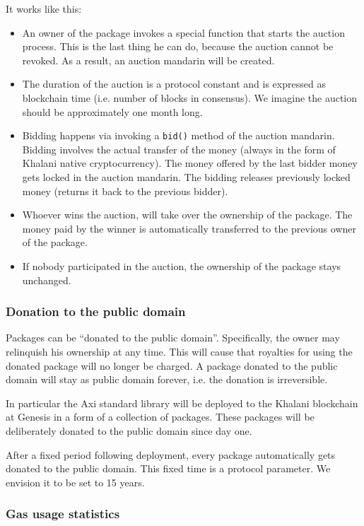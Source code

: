 \documentclass[a4paper]{article}
\newcommand{\code}[1]{{\small \texttt{#1}}}
\begin{document}
It works like this:

\begin{itemize}
  \item An owner of the package invokes a special function that starts the auction process. This is the last thing he can do, because the auction cannot be revoked. As a result, an auction mandarin will be created.
  \item The duration of the auction is a protocol constant and is expressed as blockchain time (i.e. number of blocks in consensus). We imagine the auction should be approximately one month long.
  \item Bidding happens via invoking a \code{bid()} method of the auction mandarin. Bidding involves the actual transfer of the money (always in the form of Khalani native cryptocurrency). The money offered by the last bidder money gets locked in the auction mandarin. The bidding releases previously locked money (returns it back to the previous bidder).
  \item Whoever wins the auction, will take over the ownership of the package. The money paid by the winner is automatically transferred to the previous owner of the package.
  \item If nobody participated in the auction, the ownership of the package stays unchanged.
\end{itemize}

\subsubsection{Donation to the public domain}

Packages can be ``donated to the public domain''. Specifically, the owner may relinquish his ownership at any time. This will cause that royalties for using the donated package will no longer be charged. A package donated to the public domain will stay as public domain forever, i.e. the donation is irreversible.

In particular the Axi standard library will be deployed to the Khalani blockchain at Genesis in a form of a collection of packages. These packages will be deliberately donated to the public domain since day one.

After a fixed period following deployment, every package automatically gets donated to the public domain. This fixed time is a protocol parameter. We envision it to be set to 15 years.

\subsubsection{Gas usage statistics}
\end{document}
